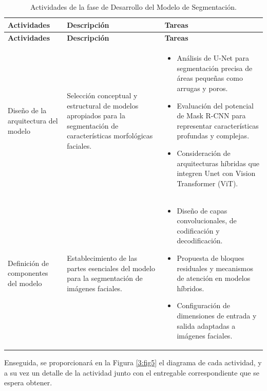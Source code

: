  \vspace{2ex}
 \begingroup
 \renewcommand\arraystretch{1.2}
 \begin{longtable}{>{\raggedright\arraybackslash}p{4cm} >{\raggedright\arraybackslash}p{4cm} >{\raggedright\arraybackslash}p{5cm}}
 \caption{Actividades de la fase de Desarrollo del Modelo de Segmentación.}
 \label{tabla:actividades_segmentacion}\\
 \toprule
 \textbf{Actividades} & \textbf{Descripción} & \textbf{Tareas} \\
 \midrule
 \endfirsthead
 
 \toprule
 \textbf{Actividades} & \textbf{Descripción} & \textbf{Tareas} \\
 \midrule
 \endhead
 
 \bottomrule
 \endfoot
 
 Diseño de la arquitectura del modelo & Selección conceptual y estructural de modelos apropiados para la segmentación de características morfológicas faciales. &
 \begin{itemize}
     \item Análisis de U-Net para segmentación precisa de áreas pequeñas como arrugas y poros.
     \item Evaluación del potencial de Mask R-CNN para representar características profundas y complejas.
     \item Consideración de arquitecturas híbridas que integren Unet con Vision Transformer (ViT).
 \end{itemize} \\
 
 Definición de componentes del modelo & Establecimiento de las partes esenciales del modelo para la segmentación de imágenes faciales. &
 \begin{itemize}
     \item Diseño de capas convolucionales, de codificación y decodificación.
     \item Propuesta de bloques residuales y mecanismos de atención en modelos híbridos.
     \item Configuración de dimensiones de entrada y salida adaptadas a imágenes faciales.
 \end{itemize} \\
 
 \end{longtable}
 \endgroup

 Enseguida, se proporcionará en la Figura \ref{3:fig5} el diagrama de cada actividad, y a su vez un detalle de la actividad junto con el entregable correspondiente que se espera obtener.
 

